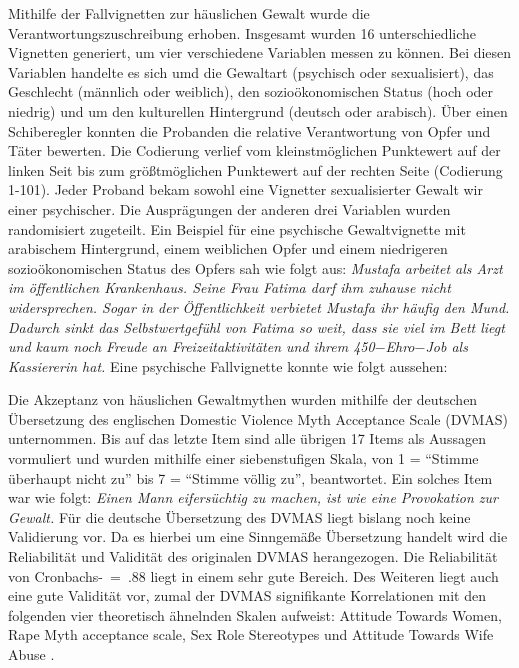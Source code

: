 Mithilfe der Fallvignetten zur häuslichen Gewalt wurde die Verantwortungszuschreibung erhoben. Insgesamt wurden 16 unterschiedliche Vignetten generiert, um vier verschiedene Variablen messen zu können. Bei diesen Variablen handelte es sich umd die Gewaltart (psychisch oder sexualisiert), das Geschlecht (männlich oder weiblich), den sozioökonomischen Status (hoch oder niedrig) und um den kulturellen Hintergrund (deutsch oder arabisch). Über einen Schiberegler konnten die Probanden die relative Verantwortung von Opfer und Täter bewerten. Die Codierung verlief vom kleinstmöglichen Punktewert auf der linken Seit bis zum größtmöglichen Punktewert auf der rechten Seite (Codierung 1-101). Jeder Proband bekam sowohl eine Vignetter sexualisierter Gewalt wir einer psychischer. Die Ausprägungen der anderen drei Variablen wurden randomisiert zugeteilt.
Ein Beispiel für eine psychische Gewaltvignette mit arabischem Hintergrund, einem weiblichen Opfer und einem niedrigeren sozioökonomischen Status des Opfers sah wie folgt aus: \textit{Mustafa arbeitet als Arzt im öffentlichen Krankenhaus. Seine Frau Fatima darf ihm zuhause nicht widersprechen. Sogar in der Öffentlichkeit verbietet Mustafa ihr häufig den Mund. Dadurch sinkt das Selbstwertgefühl von Fatima so weit, dass sie viel im Bett liegt und kaum noch Freude an Freizeitaktivitäten und ihrem 450$-$Ehro$-$Job als Kassiererin hat.} 
Eine psychische Fallvignette konnte wie folgt aussehen: %

Die Akzeptanz von häuslichen Gewaltmythen wurden mithilfe der deutschen Übersetzung des englischen Domestic Violence Myth Acceptance Scale (DVMAS) \parencite{Peters2003} unternommen. Bis auf das letzte Item sind alle übrigen 17 Items als Aussagen vormuliert und wurden mithilfe einer siebenstufigen Skala, von 1 = \enquote{Stimme überhaupt nicht zu} bis 7 = \enquote{Stimme völlig zu}, beantwortet. Ein solches Item war wie folgt: \textit{Einen Mann eifersüchtig zu machen, ist wie eine Provokation zur Gewalt.}
Für die deutsche Übersetzung des DVMAS liegt bislang noch keine Validierung vor. Da es hierbei um eine Sinngemäße Übersetzung handelt wird die Reliabilität und Validität des originalen DVMAS herangezogen. Die Reliabilität von Cronbachs-\textalpha~=~.88 liegt in einem sehr gute Bereich. Des Weiteren liegt auch eine gute Validität vor, zumal der DVMAS signifikante Korrelationen mit den folgenden vier theoretisch ähnelnden Skalen aufweist: Attitude Towards Women, Rape Myth acceptance scale, Sex Role Stereotypes und Attitude Towards Wife Abuse \parencite{DVMAS_Peters}.

